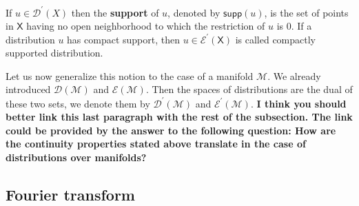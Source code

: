 \documentclass[11pt]{book}
\newcommand{\com}[1]{{\color{red}\bf #1}}
\newcommand{\supp}{\mathsf{supp}}
\newcommand{\Dcal}{\mathcal{D}}
\newcommand{\Ecal}{\mathcal{E}}
\newcommand{\Mcal}{\mathcal{M}}
\newcommand{\Xsf}{\mathsf{X}}
\theoremstyle{break}
\begin{document}
If $u\in\Dcal^\prime(X)$ then the \textbf{support} of $u$, denoted by $\supp(u)$, is the set of points in $\Xsf$ having no open neighborhood to which the restriction of $u$ is $0$. If a distribution $u$ has compact support, then $u \in \Ecal^\prime(\Xsf)$ is called compactly supported distribution.


Let us now generalize this notion to the case of a manifold $\Mcal$. We already introduced $\Dcal(\Mcal)$ and $\Ecal(\Mcal)$. Then the spaces of distributions are the dual of these two sets, we denote them by $\Dcal^\prime(\Mcal)$ and $\Ecal^\prime(\Mcal)$.
\com{ I think you should better link this last paragraph with the rest of the subsection. The link could be provided by the answer to the following question:
How are the continuity properties stated above translate in the case of distributions over manifolds?}


\subsection{Fourier transform}
\end{document}

